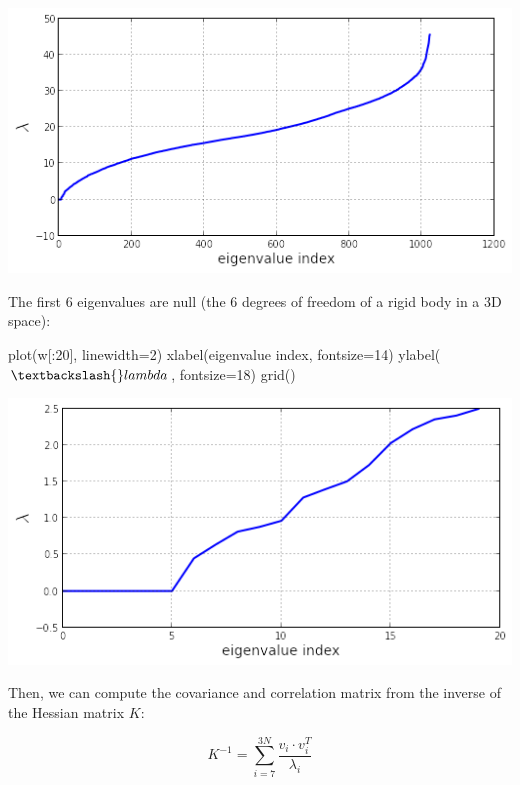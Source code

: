 \documentclass[
]{article}
\newenvironment{Shaded}{}{}
\newcommand{\DecValTok}[1]{\textcolor[rgb]{0.25,0.63,0.44}{#1}}
\newcommand{\NormalTok}[1]{#1}
\newcommand{\OperatorTok}[1]{\textcolor[rgb]{0.40,0.40,0.40}{#1}}
\newcommand{\StringTok}[1]{\textcolor[rgb]{0.25,0.44,0.63}{#1}}
\begin{document}
\includegraphics{figures/normal_modes_18_0.png}

The first 6 eigenvalues are null (the 6 degrees of freedom of a rigid
body in a 3D space):

\begin{Shaded}
\begin{Highlighting}[]
\NormalTok{plot(w[:}\DecValTok{20}\NormalTok{], linewidth}\OperatorTok{=}\DecValTok{2}\NormalTok{)}
\NormalTok{xlabel(}\StringTok{\textquotesingle{}eigenvalue index\textquotesingle{}}\NormalTok{, fontsize}\OperatorTok{=}\DecValTok{14}\NormalTok{)}
\NormalTok{ylabel(}\StringTok{\textquotesingle{}$\textbackslash{}lambda$\textquotesingle{}}\NormalTok{, fontsize}\OperatorTok{=}\DecValTok{18}\NormalTok{)}
\NormalTok{grid()}
\end{Highlighting}
\end{Shaded}

\includegraphics{figures/normal_modes_20_0.png}

Then, we can compute the covariance and correlation matrix from the
inverse of the Hessian matrix \(K\):

\[K^{-1} = \sum_{i=7}^{3N} \frac{v_{i} \cdot v_{i}^{T}}{\lambda_{i}}\]
\end{document}
